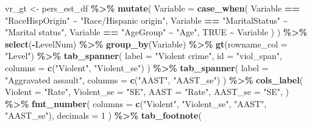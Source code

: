 \documentclass[
]{krantz}
\makeatletter
\newenvironment{Shaded}{\begin{snugshade}}{\end{snugshade}}
\newcommand{\AttributeTok}[1]{\textcolor[rgb]{0.27,0.27,0.27}{#1}}
\newcommand{\ConstantTok}[1]{\textcolor[rgb]{0.37,0.37,0.37}{#1}}
\newcommand{\DecValTok}[1]{\textcolor[rgb]{0.06,0.06,0.06}{#1}}
\newcommand{\FunctionTok}[1]{\textcolor[rgb]{0.27,0.27,0.27}{\textbf{#1}}}
\newcommand{\NormalTok}[1]{#1}
\newcommand{\OtherTok}[1]{\textcolor[rgb]{0.37,0.37,0.37}{#1}}
\newcommand{\SpecialCharTok}[1]{\textcolor[rgb]{0.43,0.43,0.43}{\textbf{#1}}}
\newcommand{\StringTok}[1]{\textcolor[rgb]{0.5,0.5,0.5}{#1}}
\newenvironment{kframe}{%
\medskip{}
\setlength{\fboxsep}{.8em}
 \def\at@end@of@kframe{}%
 \ifinner\ifhmode%
  \def\at@end@of@kframe{\end{minipage}}%
  \begin{minipage}{\columnwidth}%
 \fi\fi%
 \def\FrameCommand##1{\hskip\@totalleftmargin \hskip-\fboxsep
 \colorbox{shadecolor}{##1}\hskip-\fboxsep
     \hskip-\linewidth \hskip-\@totalleftmargin \hskip\columnwidth}%
 \MakeFramed {\advance\hsize-\width
   \@totalleftmargin\z@ \linewidth\hsize
   \@setminipage}}%
 {\par\unskip\endMakeFramed%
 \at@end@of@kframe}
\renewenvironment{Shaded}{\begin{kframe}}{\end{kframe}}
\makeatother
\begin{document}
\begin{Shaded}
\begin{Highlighting}[]
\NormalTok{vr\_gt }\OtherTok{\textless{}{-}}\NormalTok{ pers\_est\_df }\SpecialCharTok{\%\textgreater{}\%}
  \FunctionTok{mutate}\NormalTok{(}
    \AttributeTok{Variable =} \FunctionTok{case\_when}\NormalTok{(}
\NormalTok{      Variable }\SpecialCharTok{==} \StringTok{"RaceHispOrigin"} \SpecialCharTok{\textasciitilde{}} \StringTok{"Race/Hispanic origin"}\NormalTok{,}
\NormalTok{      Variable }\SpecialCharTok{==} \StringTok{"MaritalStatus"} \SpecialCharTok{\textasciitilde{}} \StringTok{"Marital status"}\NormalTok{,}
\NormalTok{      Variable }\SpecialCharTok{==} \StringTok{"AgeGroup"} \SpecialCharTok{\textasciitilde{}} \StringTok{"Age"}\NormalTok{,}
      \ConstantTok{TRUE} \SpecialCharTok{\textasciitilde{}}\NormalTok{ Variable}
\NormalTok{    )}
\NormalTok{  ) }\SpecialCharTok{\%\textgreater{}\%}
  \FunctionTok{select}\NormalTok{(}\SpecialCharTok{{-}}\NormalTok{LevelNum) }\SpecialCharTok{\%\textgreater{}\%}
  \FunctionTok{group\_by}\NormalTok{(Variable) }\SpecialCharTok{\%\textgreater{}\%}
  \FunctionTok{gt}\NormalTok{(}\AttributeTok{rowname\_col =} \StringTok{"Level"}\NormalTok{) }\SpecialCharTok{\%\textgreater{}\%}
  \FunctionTok{tab\_spanner}\NormalTok{(}
    \AttributeTok{label =} \StringTok{"Violent crime"}\NormalTok{,}
    \AttributeTok{id =} \StringTok{"viol\_span"}\NormalTok{,}
    \AttributeTok{columns =} \FunctionTok{c}\NormalTok{(}\StringTok{"Violent"}\NormalTok{, }\StringTok{"Violent\_se"}\NormalTok{)}
\NormalTok{  ) }\SpecialCharTok{\%\textgreater{}\%}
  \FunctionTok{tab\_spanner}\NormalTok{(}
    \AttributeTok{label =} \StringTok{"Aggravated assault"}\NormalTok{,}
    \AttributeTok{columns =} \FunctionTok{c}\NormalTok{(}\StringTok{"AAST"}\NormalTok{, }\StringTok{"AAST\_se"}\NormalTok{)}
\NormalTok{  ) }\SpecialCharTok{\%\textgreater{}\%}
  \FunctionTok{cols\_label}\NormalTok{(}
    \AttributeTok{Violent =} \StringTok{"Rate"}\NormalTok{,}
    \AttributeTok{Violent\_se =} \StringTok{"SE"}\NormalTok{,}
    \AttributeTok{AAST =} \StringTok{"Rate"}\NormalTok{,}
    \AttributeTok{AAST\_se =} \StringTok{"SE"}\NormalTok{,}
\NormalTok{  ) }\SpecialCharTok{\%\textgreater{}\%}
  \FunctionTok{fmt\_number}\NormalTok{(}
    \AttributeTok{columns =} \FunctionTok{c}\NormalTok{(}\StringTok{"Violent"}\NormalTok{, }\StringTok{"Violent\_se"}\NormalTok{, }\StringTok{"AAST"}\NormalTok{, }\StringTok{"AAST\_se"}\NormalTok{),}
    \AttributeTok{decimals =} \DecValTok{1}
\NormalTok{  ) }\SpecialCharTok{\%\textgreater{}\%}
  \FunctionTok{tab\_footnote}\NormalTok{(}

\end{Highlighting}
\end{Shaded}
\end{document}
